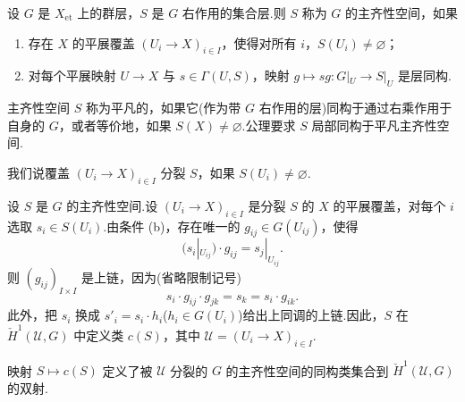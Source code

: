 设 $G$ 是 $X_{\mathrm{et}}$ 上的群层，$S$ 是 $G$ 右作用的集合层.则 $S$ 称为 $G$ 的主齐性空间，如果
\begin{enumerate}
  \item 存在 $X$ 的平展覆盖 $(U_i \to X)_{i \in I}$，使得对所有 $i$，$S(U_i) \neq \varnothing$；
  \item 对每个平展映射 $U \to X$ 与 $s \in \Gamma(U, S)$，映射 $g \mapsto sg \colon G|_{U} \to S|_{U}$ 是层同构.
\end{enumerate}

主齐性空间 $S$ 称为平凡的，如果它(作为带 $G$ 右作用的层)同构于通过右乘作用于自身的 $G$，或者等价地，如果 $S(X) \neq \varnothing$.公理要求 $S$ 局部同构于平凡主齐性空间.

我们说覆盖 $(U_i \to X)_{i \in I}$ 分裂 $S$，如果 $S(U_i) \neq \varnothing$.

设 $S$ 是 $G$ 的主齐性空间.设 $(U_i \to X)_{i \in I}$ 是分裂 $S$ 的 $X$ 的平展覆盖，对每个 $i$ 选取 $s_i \in S(U_i)$.由条件 (b)，存在唯一的 $g_{ij} \in G(U_{ij})$，使得
\[
(s_i|_{U_{ij}}) \cdot g_{ij} = s_j|_{U_{ij}}.
\]
则 $(g_{ij})_{I \times I}$ 是上链，因为(省略限制记号)
\[
s_i \cdot g_{ij} \cdot g_{jk} = s_k = s_i \cdot g_{ik}.
\]
此外，把 $s_i$ 换成 $s'_i = s_i \cdot h_i$($h_i \in G(U_i)$)给出上同调的上链.因此，$S$ 在 $\check{H}^{1}(\mathcal{U}, G)$ 中定义类 $c(S)$，其中 $\mathcal{U} = (U_i \to X)_{i \in I}$.

\begin{proposition}\label{prop:11.1}
映射 $S \mapsto c(S)$ 定义了被 $\mathcal{U}$ 分裂的 $G$ 的主齐性空间的同构类集合到 $\check{H}^{1}(\mathcal{U}, G)$ 的双射.
\end{proposition}


